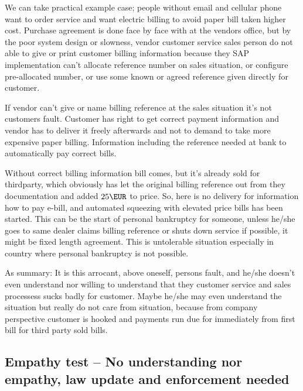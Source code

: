 We can take practical example case; people without email and cellular
phone\cite{HS202412141445} want to order service and want electric billing
to avoid paper bill taken higher cost. Purchase agreement is done face by face
with at the vendors office, but by the poor system design or slowness, vendor
customer service sales person do not able to give or print customer billing
information because they SAP implementation can't allocate reference number on
sales situation, or configure pre-allocated number, or use some known or
agreed reference given directly for customer.

If vendor can't give or name billing reference at the sales situation it's not
customers fault. Customer has right to get correct payment information and
vendor has to deliver it freely afterwards and not to demand to take more
expensive paper billing. Information including the reference needed at bank to
automatically pay correct bills.

Without correct billing information bill comes, but it's already sold for
thirdparty, which obviously has let the original billing reference out from
they documentation and added $25\EUR$ to price. So, here is no delivery for
information how to pay e-bill, and automated squeezing with elevated price
bills has been started. This can be the start of personal bankruptcy for
someone, unless he/she goes to same dealer claims billing reference or shuts
down service if possible, it might be fixed length agreement. This is
untolerable situation especially in country where personal bankruptcy
\cite{PersonalBankruptcy} is not possible.

As summary: It is this arrocant, above oneself, persons fault, and he/she
doesn't even understand nor willing to understand that they customer service
and sales processess sucks badly\cite{OwnFault} for
customer\cite{HS202412141445}. Maybe he/she may even understand the situation
but really do not care from situation, because from company perspective
customer is hooked and payments run due for immediately from first bill for
third party sold bills.

\subsection{Empathy test -- No understanding nor empathy, law update and enforcement needed}
\label{Empathy_test_fail_law_needed}

